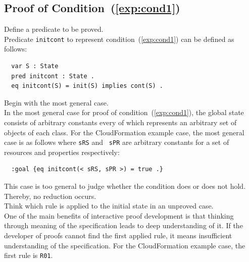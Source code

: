 \documentclass[12pt]{report}
\begin{document}
\subsection{Proof of Condition~(\ref{exp:cond1})}
\label{sec:TOSCAinitcont}
 Define a predicate to be proved. \\
Predicate {\tt initcont} to represent condition~(\ref{exp:cond1}) can be defined as follows:
\small
\begin{verbatim}
  var S : State
  pred initcont : State .
  eq initcont(S) = init(S) implies cont(S) .
\end{verbatim}
\normalsize

 Begin with the most general case. \\ In the
most general case for proof of condition~(\ref{exp:cond1}), the global
state consists of arbitrary constants every of which represents an
arbitrary set of objects of each class. For the CloudFormation example
case, the most general case is as follows where {\tt sRS} and {\tt
  sPR} are arbitrary constants for a set of resources and properties
respectively:
\small
\begin{verbatim}
  :goal {eq initcont(< sRS, sPR >) = true .}
\end{verbatim}
\normalsize
This case is too general to judge whether the condition does or does
not hold. Thereby, no reduction occurs.\\

 Think which rule is applied to the initial
state in an unproved case. \\ One of the main benefits of interactive
proof development is that thinking through meaning of the
specification leads to deep understanding of it. If the developer of
proofs cannot find the first applied rule, it means insufficient
understanding of the specification. For the CloudFormation example
case, the first rule is {\tt R01}. \\
\end{document}
